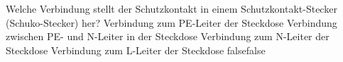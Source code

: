     {Welche Verbindung stellt der Schutzkontakt in einem Schutzkontakt-Stecker (Schuko-Stecker) her?}
    {Verbindung zum PE-Leiter der Steckdose}
    {Verbindung zwischen PE- und N-Leiter in der Steckdose}
    {Verbindung zum N-Leiter der Steckdose}
    {Verbindung zum L-Leiter der Steckdose}
    {false}{false}